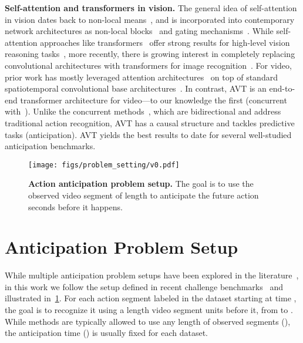 \documentclass[10pt,twocolumn,letterpaper]{article}
\newcommand{\method}{AVT\xspace}
\begin{document}
{\noindent \bf Self-attention and transformers in vision.}
The general idea of self-attention in vision dates back to non-local means~\cite{buades2005non}, and is incorporated into contemporary network architectures as non-local blocks~\cite{wang2017non,wu2019long,liu2019non,cao2019gcnet} and gating mechanisms~\cite{kong2017low,xie2018rethinking,girdhar2017attentional,miech17loupe}. While self-attention approaches like transformers~\cite{vaswani2017attention,wang2019learning} offer strong results for high-level vision reasoning tasks~\cite{carion2020end,zhao2020point}, more recently, there is growing interest in completely replacing convolutional architectures with transformers for image recognition~\cite{dosovitskiy2021image,touvron2020deit}. For video, prior work 
has mostly leveraged attention architectures~\cite{wu2019long,wang2017non,girdhar2019video} on top of 
standard spatiotemporal convolutional base architectures~\cite{carreira2017quo,tran2015learning,tran2018closer}.
In contrast, \method is an end-to-end transformer architecture for video---to our knowledge the first (concurrent with~\cite{bertasius2021is,neimark2021video,arnab2021vivit,fan2021multiscale,li2021vidtr}).
Unlike the concurrent methods~\cite{bertasius2021is,neimark2021video,arnab2021vivit,fan2021multiscale,li2021vidtr}, which 
are bidirectional and address traditional action recognition,
\method has a causal structure and tackles predictive tasks (anticipation). \method yields 
the best results to date for several well-studied anticipation benchmarks.  










 
\begin{figure}[t]
    \centering
\texttt{[image: figs/problem\_setting/v0.pdf]}
    \caption{{\bf Action anticipation problem setup.} The goal is to use the observed video segment of length  to anticipate the future action  seconds before it happens.}\label{fig:problem_setup}
\end{figure}
 
\section{Anticipation Problem Setup}\label{sec:app:prob_setup}


While multiple anticipation problem setups have been explored in the literature~\cite{kitani2012activity,rhinehart2017first,nagrajan2020egotopo}, in this work we follow the setup defined in recent challenge benchmarks~\cite{Damen2018EPICKITCHENS,damen2020rescaling} and illustrated in~\cref{fig:problem_setup}. For each action segment labeled in the dataset starting at time , the goal is to recognize it using a  length video segment  units before it, \ie from  to . While methods are typically allowed to use any length of observed segments (), the anticipation time () is usually fixed for each dataset. 
\end{document}
